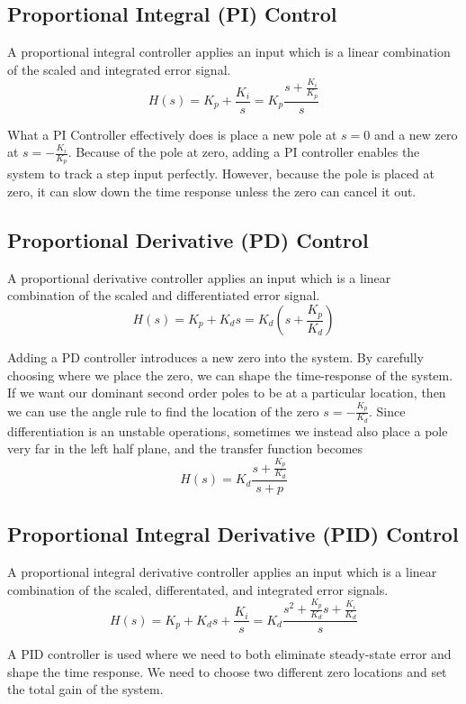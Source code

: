 \subsection{Proportional Integral (PI) Control}
\begin{definition}
  A proportional integral controller applies an input which is a linear combination of the scaled and integrated error signal.
  \[
	H(s) = K_p+\frac{K_i}{s} = K_p \frac{s + \frac{K_i}{K_p}}{s}
  \]
  \label{defn:pi-controller}
\end{definition}
What a PI Controller effectively does is place a new pole at $s=0$ and a new zero at $s=-\frac{K_i}{K_p}$.
Because of the pole at zero, adding a PI controller enables the system to track a step input perfectly.
However, because the pole is placed at zero, it can slow down the time response unless the zero can cancel it out.
\subsection{Proportional Derivative (PD) Control}
\begin{definition}
  A proportional derivative controller applies an input which is a linear combination of the scaled and differentiated error signal.
  \[
	H(s) = K_p + K_ds = K_d\left(s + \frac{K_p}{K_d}\right)
  \]
  \label{defn:pd-controller}
\end{definition}
Adding a PD controller introduces a new zero into the system. By carefully choosing where we place the zero, we can shape the time-response of the system.
If we want our dominant second order poles to be at a particular location, then we can use the angle rule to find the location of the zero $s=-\frac{K_p}{K_d}$.
Since differentiation is an unstable operations, sometimes we instead also place a pole very far in the left half plane, and the transfer function becomes
\[
  H(s) =K_d \frac{s+\frac{K_p}{K_d}}{s+p}
\]
\subsection{Proportional Integral Derivative (PID) Control}
\begin{definition}
  A proportional integral derivative controller applies an input which is a linear combination of the scaled, differentated, and integrated error signals.
  \[
	H(s) = K_p+K_ds + \frac{K_i}{s} = K_d \frac{s^2 + \frac{K_p}{K_d}s + \frac{K_i}{K_d}}{s}
  \]
  \label{defn:pid-controller}
\end{definition}
A PID controller is used where we need to both eliminate steady-state error and shape the time response. We need to choose two different zero locations and set the total gain of the system.
